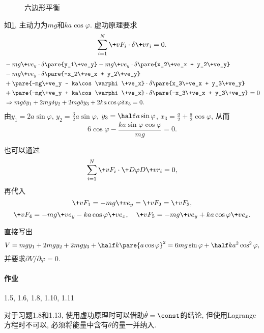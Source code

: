 \documentclass[../LectureNotes.tex]{subfiles}
\begin{document}
\begin{figure}[ht]
    \centering
    \caption{六边形平衡}
    \label{fig:六边形平衡2}
\end{figure}
\begin{sample}
    \begin{ex}
        如\cref{fig:六边形平衡2}, 主动力为$mg$和$ka\cos\varphi$. 虚功原理要求
        \[ \sum_{i=1}^N \+vF_i\cdot\delta\+vr_i = 0. \]
        \begin{align*}
            &-mg\+ve_y\cdot\delta\pare{y_1\+ve_y} - mg\+ve_y\cdot\delta\pare{x_2\+ve_x + y_2\+ve_y}\\
            &-mg\+ve_y\cdot\delta\pare{-x_2\+ve_x + y_2\+ve_y}\\
            &+\pare{-mg\+ve_y - ka\cos\varphi \+ve_x}\cdot\delta\pare{x_3\+ve_x + y_3\+ve_y} \\
            &+\pare{-mg\+ve_y + ka\cos\varphi \+ve_x}\cdot\delta\pare{-x_3\+ve_x + y_3\+ve_y} = 0 \\
            &\Rightarrow mg\delta y_1 + 2mg\delta y_2 + 2mg\delta y_3 + 2ka\cos\varphi\delta x_3 = 0.
        \end{align*}
        由$y_1=2a\sin\varphi$, $y_2 = \frac{3}{2}a\sin\varphi$, $y_3 =\half a\sin\varphi$, $x_3 = \frac{a}{2} + \frac{a}{2}\cos\varphi$, 从而
        \[ 6\cos\varphi - \frac{ka\sin\varphi\cos\varphi}{mg} = 0. \]
    \end{ex}
    \begin{ex}
        也可以通过
        \[ \sum_{i=1}^N \+vF_i \cdot \+D{\varphi}D{\+vr_i} = 0, \]
        再代入
        \[ \+vF_1 = -mg\+ve_y = \+vF_2 = \+vF_3, \]
        \[ \+vF_4 = -mg\+ve_y - ka\cos\varphi\+ve_x,\quad \+vF_5 = -mg\+ve_y + ka\cos\varphi\+ve_x. \]
    \end{ex}
    \begin{ex}
        直接写出
        \[ V = mgy_1 + 2mgy_2 + 2mgy_3 + \half k\pare{a\cos\varphi}^2 = 6mg\sin\varphi + \half ka^2\cos^2\varphi, \]
        并要求$\partial V/\partial \varphi = 0$.
    \end{ex}
\end{sample}
\paragraph{作业} %
\label{par:作业}

1.5, 1.6, 1.8, 1.10, 1.11


\begin{remark}
    对于习题1.8和1.13, 使用虚功原理时可以借助$\dot{\theta}=\const$的结论, 但使用Lagrange方程时不可以, 必须将能量中含有$\dot{\theta}$的量一并纳入.
\end{remark}
\end{document}
